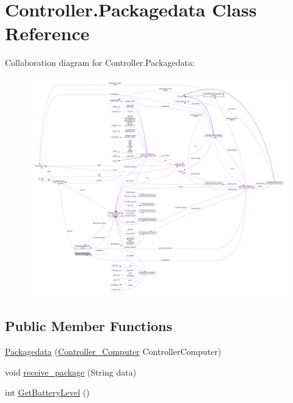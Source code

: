 \hypertarget{class_controller_1_1_packagedata}{}\section{Controller.\+Packagedata Class Reference}
\label{class_controller_1_1_packagedata}


Collaboration diagram for Controller.\+Packagedata\+:
\nopagebreak
\begin{figure}[H]
\begin{center}
\leavevmode
\includegraphics[width=350pt]{class_controller_1_1_packagedata__coll__graph}
\end{center}
\end{figure}
\subsection*{Public Member Functions}
\begin{DoxyCompactItemize}
\item 
\hyperlink{class_controller_1_1_packagedata_a7c841063034e37cd52339b7d6b2fce4a}{Packagedata} (\hyperlink{class_controller_1_1_controller___computer}{Controller\+\_\+\+Computer} Controller\+Computer)
\item 
void \hyperlink{class_controller_1_1_packagedata_af59e3421f44bc61c72b1b483bc43d077}{receive\+\_\+package} (String data)
\item 
int \hyperlink{class_controller_1_1_packagedata_a6a3a7e30e19292cc38188365e206a5a1}{Get\+Battery\+Level} ()
\end{DoxyCompactItemize}

